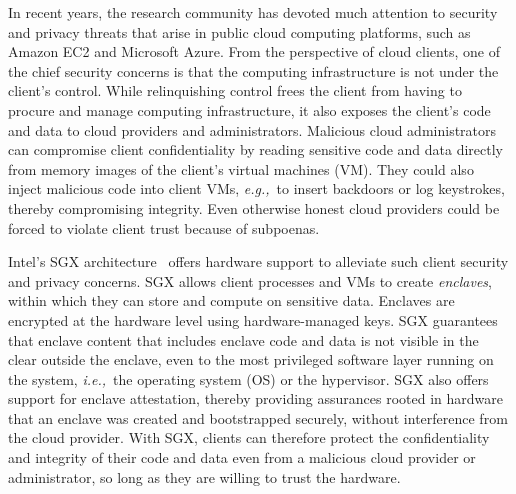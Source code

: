 \documentclass[conference,compsoc]{IEEEtran}
\newcommand{\eg}{\textit{e.g.,}\xspace}
\newcommand{\ie}{\textit{i.e.,}\xspace}
\begin{document}
In recent years, the research community has devoted much attention to security
and privacy threats that arise in public cloud computing platforms, such as
Amazon EC2 and Microsoft Azure. From the perspective of cloud clients, one of
the chief security concerns is that the computing infrastructure is not under
the client's control. While relinquishing control frees the client from having
to procure and manage computing infrastructure, it also exposes the client's
code and data to cloud providers and administrators. Malicious cloud
administrators can compromise client confidentiality by reading sensitive code
and data directly from memory images of the client's virtual machines (VM).
They could also inject malicious code into client VMs, \eg~to insert backdoors
or log keystrokes, thereby compromising integrity. Even otherwise honest cloud
providers could be forced to violate client trust because of subpoenas.

Intel's SGX
architecture~\cite{sgx:attest:hasp13,sgx:instructions:hasp13,sgx:isolated:hasp13,intelsgx:sep13,intelsgx:oct14}
offers hardware support to alleviate such client security and privacy concerns.
SGX allows client processes and VMs to create \textit{enclaves}, within which
they can store and compute on sensitive data.  Enclaves are encrypted at the
hardware level using hardware-managed keys. SGX guarantees that enclave content that includes enclave code and data is not visible in the clear outside the enclave, even to the most privileged
software layer running on the system, \ie~the operating system (OS) or the
hypervisor. SGX also offers support for enclave attestation, thereby providing
assurances rooted in hardware that an enclave was created and bootstrapped
securely, without interference from the cloud provider.  With SGX, clients can
therefore protect the confidentiality and integrity of their code and data even
from a malicious cloud provider or administrator, so long as they are willing
to trust the hardware.
\end{document}
